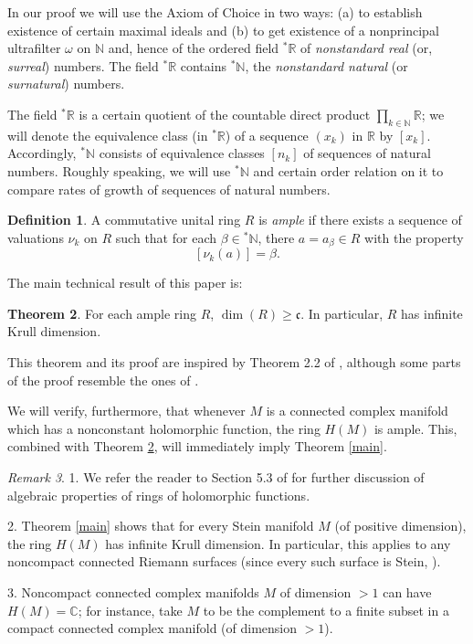 \documentclass{amsproc}
\theoremstyle{definition}
\newtheorem{theorem}{Theorem}
\theoremstyle{definition}
\newtheorem{definition}[theorem]{Definition}
\theoremstyle{remark}
\newtheorem{remark}[theorem]{Remark}
\begin{document}
In our proof we will use the Axiom of Choice  in two ways: (a) to establish existence of certain maximal ideals and  
(b) to get existence of a nonprincipal ultrafilter ${\omega}$ on ${{\mathbb N}}$ and, hence of the ordered field ${{}^{*}{{\mathbb R}}}$ of 
{\em nonstandard real} (or, {\em surreal}) numbers. The field ${{}^{*}{{\mathbb R}}}$ contains ${{}^{*}{{\mathbb N}}}$, the {\em nonstandard natural} (or {\em surnatural}) numbers.

The field ${{}^{*}{{\mathbb R}}}$ is a certain quotient of the countable direct product $\prod_{k\in {{\mathbb N}}} {{\mathbb R}}$; we will denote the equivalence class (in ${{}^{*}{{\mathbb R}}}$) of a sequence $(x_k)$ in ${{\mathbb R}}$  by $[x_k]$. Accordingly, ${{}^{*}{{\mathbb N}}}$ consists of equivalence classes $[n_k]$ of sequences of natural numbers. Roughly speaking, we will use ${{}^{*}{{\mathbb N}}}$ and certain order relation on it to compare rates of growth of sequences of  natural numbers. 

\begin{definition}\label{defn:ample}
A commutative unital ring $R$ is {\em ample} if there exists a sequence of valuations $\nu_k$ on $R$ such that for each ${\beta}\in {{}^{*}{{\mathbb N}}}$, there $a=a_{\beta}\in R$ with the property
\begin{equation}\label{1}
[\nu_{k}(a)]= {\beta}  . 
\end{equation}
\end{definition}

\medskip
The main technical result of this paper is: 

\begin{theorem}\label{thm:T}
For each ample ring  $R$, $\dim(R)\ge {\mathfrak c}$.  In particular, $R$ has infinite Krull dimension. 
\end{theorem}

This theorem and its proof are inspired by Theorem 2.2 of \cite{Sasane}, although some parts of the proof resemble the ones of \cite{Henricksen}. 

We will verify, furthermore, that whenever $M$ is a connected complex manifold which has a nonconstant holomorphic function, the ring $H(M)$ is ample.  This, combined with Theorem \ref{thm:T}, will immediately imply Theorem \ref{main}. 

\begin{remark}
1. We refer the reader to Section 5.3 of \cite{Clark} for further discussion of algebraic properties of rings of holomorphic functions.

2. Theorem \ref{main} shows that for every Stein manifold $M$ (of positive dimension), the ring $H(M)$ has infinite Krull dimension. In particular, this applies to any noncompact connected Riemann surfaces (since every such surface is Stein, \cite{BS}). 

3. Noncompact connected complex manifolds $M$ of dimension $>1$ can have  $H(M)={{\mathbb C}}$; for instance, take $M$ to be the complement to a finite subset in a compact connected complex manifold (of dimension $>1$). 
\end{remark}
\end{document}
